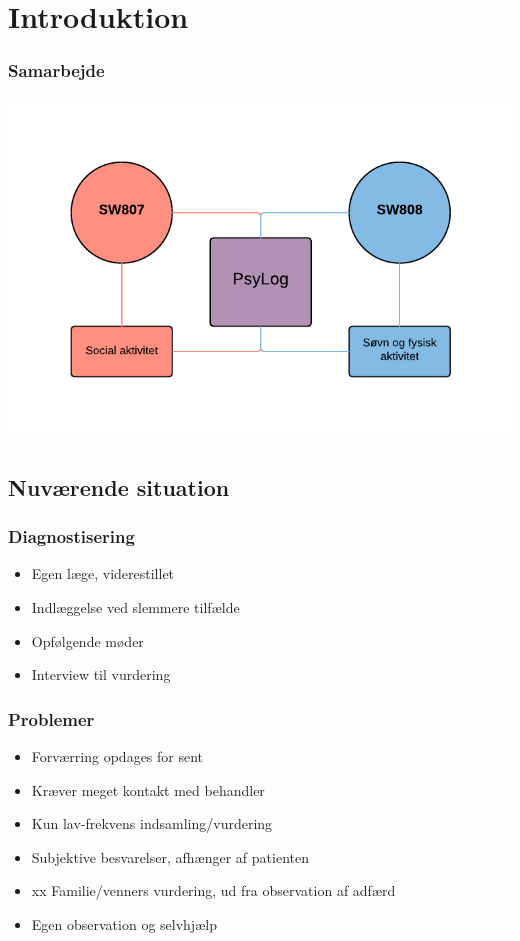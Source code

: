 \section{Introduktion}

\begin{frame}
\frametitle{Samarbejde}

\includegraphics[width=\textwidth]{graphics/samarbejde.pdf}

\end{frame}

\subsection{Nuværende situation}

\begin{frame}
\frametitle{Diagnostisering}

\begin{itemize}
\item Egen læge, viderestillet
\item Indlæggelse ved slemmere tilfælde
\item Opfølgende møder
\item Interview til vurdering
\end{itemize}

\end{frame}

\begin{frame}
\frametitle{Problemer}
\begin{itemize}
\item Forværring opdages for sent
\item Kræver meget kontakt med behandler
\item Kun lav-frekvens indsamling/vurdering
\item Subjektive besvarelser, afhænger af patienten
\item xx Familie/venners vurdering, ud fra observation af adfærd
\item Egen observation og selvhjælp
\end{itemize}

\end{frame}


